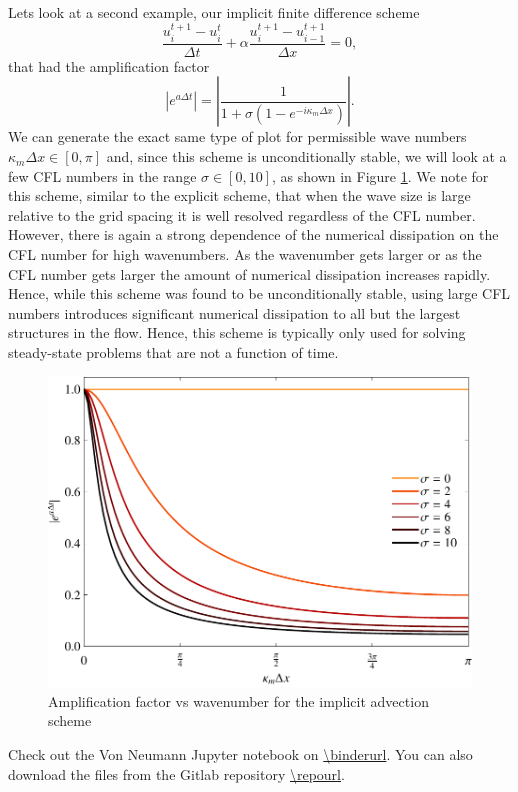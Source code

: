 Lets look at a second example, our implicit finite difference scheme
\begin{equation}
	\frac{u_i^{t+1} - u_{i}^t}{\Delta t} +  \alpha \frac{u_i^{t+1} - u_{i-1}^{t+1}}{\Delta x} = 0,
\end{equation}
that had the amplification factor
\begin{equation}
	|e^{a\Delta t}| = \left| \frac{1}{1 + \sigma \left( 1 - e^{-i \kappa_m \Delta x} \right)} \right|.
\end{equation}
We can generate the exact same type of plot for permissible wave numbers $\kappa_m \Delta x \in [0,\pi]$ and, since this scheme is unconditionally stable, we will look at a few CFL numbers in the range $\sigma \in [0,10]$, as shown in Figure \ref{fig:dissipation_advection_implicit}. We note for this scheme, similar to the explicit scheme, that when the wave size is large relative to the grid spacing it is well resolved regardless of the CFL number. However, there is again a strong dependence of the numerical dissipation on the CFL number for high wavenumbers. As the wavenumber gets larger or as the CFL number gets larger the amount of numerical dissipation increases rapidly. Hence, while this scheme was found to be unconditionally stable, using large CFL numbers introduces significant numerical dissipation to all but the largest structures in the flow. Hence, this scheme is typically only used for solving steady-state problems that are not a function of time.
\begin{figure}[htbp]
	\centering
	\includegraphics[width=0.6\linewidth]{Pictures/dissipation_adv_implct}
	\caption{Amplification factor vs wavenumber for the implicit advection scheme}
	\label{fig:dissipation_advection_implicit}
\end{figure}
\begin{jupyternote}
	Check out the Von Neumann Jupyter notebook on \url{\binderurl}. You can also download the files from the Gitlab repository \url{\repourl}.
\end{jupyternote}

